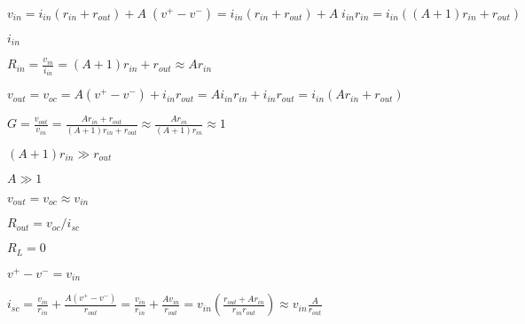 \documentclass{article}
\def\lthtmlcheckvsize{\ifdim\ht\sizebox<\vsize 
  \ifdim\wd\sizebox<\hsize\expandafter\hfill\fi \expandafter\vfill
  \else\expandafter\vss\fi}%
\begin{document}
{\newpage\clearpage
{}%
$\displaystyle v_{in}=i_{in}(r_{in}+r_{out})+A\;(v^+-v^-)
=i_{in}(r_{in}+r_{out})+A\;i_{in}r_{in}
=i_{in}((A+1)r_{in}+r_{out})$%
\lthtmlindisplaymathZ
\lthtmlcheckvsize\clearpage}

{\newpage\clearpage
{}%
$ i_{in}$%
\lthtmlindisplaymathZ
\lthtmlcheckvsize\clearpage}

{\newpage\clearpage
{}%
$\displaystyle R_{in}=\frac{v_{in}}{i_{in}}=(A+1)r_{in}+r_{out} \approx Ar_{in}$%
\lthtmlindisplaymathZ
\lthtmlcheckvsize\clearpage}

{\newpage\clearpage
{}%
$\displaystyle v_{out}=v_{oc}=A(v^+-v^-)+i_{in}r_{out}=Ai_{in}r_{in}+i_{in}r_{out}
=i_{in}(Ar_{in}+r_{out})$%
\lthtmlindisplaymathZ
\lthtmlcheckvsize\clearpage}

{\newpage\clearpage
{}%
$\displaystyle G=\frac{v_{out}}{v_{in}}=\frac{Ar_{in}+r_{out}}{(A+1)r_{in}+r_{out}}
\approx \frac{Ar_{in}}{(A+1)r_{in}}\approx 1$%
\lthtmlindisplaymathZ
\lthtmlcheckvsize\clearpage}

{\newpage\clearpage
{}%
$ (A+1)r_{in}\gg r_{out}$%
\lthtmlindisplaymathZ
\lthtmlcheckvsize\clearpage}

{\newpage\clearpage
{}%
$ A\gg 1$%
\lthtmlindisplaymathZ
\lthtmlcheckvsize\clearpage}

{\newpage\clearpage
{}%
$\displaystyle v_{out}=v_{oc}\approx v_{in}$%
\lthtmlindisplaymathZ
\lthtmlcheckvsize\clearpage}

{\newpage\clearpage
{}%
$ R_{out}=v_{oc}/i_{sc}$%
\lthtmlindisplaymathZ
\lthtmlcheckvsize\clearpage}

{\newpage\clearpage
{}%
$ R_L=0$%
\lthtmlindisplaymathZ
\lthtmlcheckvsize\clearpage}

{\newpage\clearpage
{}%
$ v^+-v^-=v_{in}$%
\lthtmlindisplaymathZ
\lthtmlcheckvsize\clearpage}

{\newpage\clearpage
{}%
$\displaystyle i_{sc}=\frac{v_{in}}{r_{in}}+\frac{A(v^+-v^-)}{r_{out}}
=\frac{v_{in}}{r_{in}}+\frac{Av_{in}}{r_{out}}
=v_{in}\left(\frac{r_{out}+Ar_{in}}{r_{in}r_{out}}\right)
\approx v_{in}\frac{A}{r_{out}}$%
\lthtmlindisplaymathZ
\lthtmlcheckvsize\clearpage}
\end{document}
